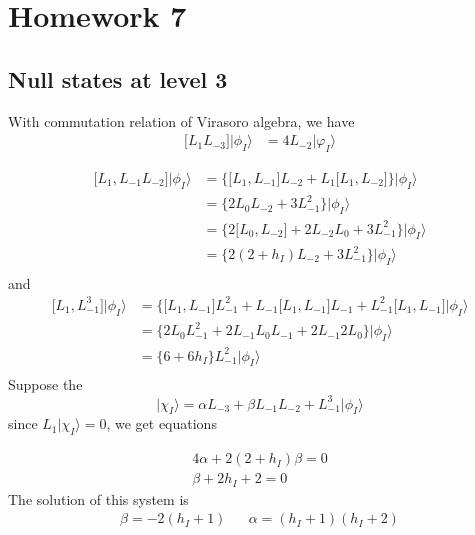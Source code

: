 \newpage
\section{Homework 7}
\subsection{Null states at level 3}
With commutation relation of Virasoro algebra, we have
\[
\begin{aligned}
\lbrack L_1 L_{-3}\rbrack \big| \phi_I \rangle & = 4 L_{-2} \big| \varphi_I \rangle
\end{aligned}
\]

\[
\begin{aligned}
\lbrack L_1, L_{-1}L_{-2} \rbrack \big| \phi_I \rangle & = \lbrace \lbrack L_1, L_{-1} \rbrack L_{-2} + L_1 \lbrack L_1, L_{-2} \rbrack \rbrace \big| \phi_I \rangle\\
&= \lbrace 2 L_0 L_{-2} + 3 L_{-1}^2 \rbrace \big| \phi_I \rangle \\
& = \lbrace 2\lbrack L_0, L_{-2}\rbrack + 2L_{-2} L_0 + 3 L_{-1}^2 \rbrace \big| \phi_I \rangle\\
& = \lbrace 2(2+ h_I )L_{-2} + 3 L_{-1}^2 \rbrace \big| \phi_I \rangle\\
\end{aligned}
\]
and 
\[
\begin{aligned}
\lbrack L_1 , L^3_{-1} \rbrack \big| \phi_I \rangle &= \lbrace \lbrack L_1, L_{-1} \rbrack L_{-1}^2 + L_{-1} \lbrack L_1, L_{-1} \rbrack L_{-1} + L_{-1}^2 \lbrack L_1, L_{-1} \rbrack \big| \phi_I \rangle\\
&= \lbrace 2 L_0 L_{-1}^2 + 2 L_{-1}L_0 L_{-1} + 2 L_{-1}2 L_0 \rbrace \big| \phi_I \rangle \\
& = \lbrace 6 + 6 h_I \rbrace L_{-1}^2 \big| \phi_I \rangle\\
\end{aligned}
\]
Suppose the 
\[
\big| \chi_I \rangle = \alpha L_{-3} + \beta L_{-1}L_{-2} +  L_{-1}^3 \big| \phi_I \rangle
\]
since $L_1 \big| \chi_I \rangle = 0$, we get equations

\begin{eqnarray}
4 \alpha + 2(2+ h_I) \beta =0\\
\beta + 2h_I +2 =0 
\end{eqnarray}
The solution of this system is 
\[
\begin{aligned}
\beta = -2(h_I +1) & & \alpha = (h_I + 1)(h_I + 2)
\end{aligned}
\]

